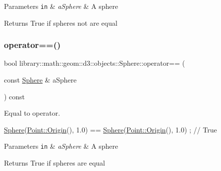 \begin{DoxyParams}[1]{Parameters}
\mbox{\tt in}  & {\em a\+Sphere} & A sphere \\
\hline
\end{DoxyParams}
\begin{DoxyReturn}{Returns}
True if spheres not are equal 
\end{DoxyReturn}
\mbox{\label{classlibrary_1_1math_1_1geom_1_1d3_1_1objects_1_1_sphere_ace12dcb88802f002f5797077130c4b98}} 
\subsubsection{\texorpdfstring{operator==()}{operator==()}}
{\footnotesize\ttfamily bool library\+::math\+::geom\+::d3\+::objects\+::\+Sphere\+::operator== (\begin{DoxyParamCaption}\item[{const \hyperlink{classlibrary_1_1math_1_1geom_1_1d3_1_1objects_1_1_sphere}{Sphere} \&}]{a\+Sphere }\end{DoxyParamCaption}) const}



Equal to operator. 


\begin{DoxyCode}
\hyperlink{classlibrary_1_1math_1_1geom_1_1d3_1_1objects_1_1_sphere_a55dccc8ea16ee55cd7694c26afa8ea39}{Sphere}(\hyperlink{classlibrary_1_1math_1_1geom_1_1d3_1_1objects_1_1_point_ab2a38e285c562e50bf350272c083986f}{Point::Origin}(), 1.0) == \hyperlink{classlibrary_1_1math_1_1geom_1_1d3_1_1objects_1_1_sphere_a55dccc8ea16ee55cd7694c26afa8ea39}{Sphere}(\hyperlink{classlibrary_1_1math_1_1geom_1_1d3_1_1objects_1_1_point_ab2a38e285c562e50bf350272c083986f}{Point::Origin}(), 1.0) ; \textcolor{comment}{//
       True}
\end{DoxyCode}



\begin{DoxyParams}[1]{Parameters}
\mbox{\tt in}  & {\em a\+Sphere} & A sphere \\
\hline
\end{DoxyParams}
\begin{DoxyReturn}{Returns}
True if spheres are equal 
\end{DoxyReturn}
\mbox{\label{classlibrary_1_1math_1_1geom_1_1d3_1_1objects_1_1_sphere_adc05fd7666ae15513e6aa9ec66a1ca9b}} 
